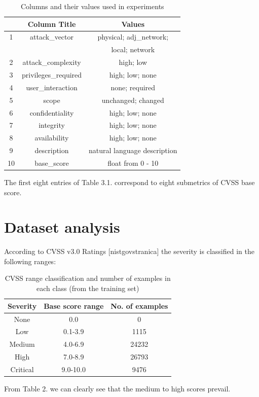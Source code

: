 \documentclass[times, utf8, zavrsni, english]{fer}
\begin{document}
\begin{table}[h!]
	\centering
	\begin{tabular}{||c c c ||} 
		\hline
		 & Column Title & Values  \\ [0.5ex] 
		\hline\hline
		
		1 & attack\_vector & physical; adj\_network;   \\
		 & &  local; network \\
		2 & attack\_complexity & high; low  \\
		3 & privileges\_required & high; low; none  \\
		4 & user\_interaction & none; required \\ 
		5 & scope & unchanged; changed \\ 
		6 & confidentiality & high; low; none  \\
		7 & integrity & high; low; none  \\
		8 & availability & high; low; none  \\
		
		\hline\hline
		9 & description & natural language description \\
		10 & base\_score & float from 0 - 10 \\
		\hline
	\end{tabular}
\caption{Columns and their values used in experiments}
\label{table:1}
\end{table}

The first eight entries of Table 3.1. correspond to eight submetrics of CVSS base score.
\section{Dataset analysis}
According to CVSS v3.0 Ratings [nistgovstranica] the severity is classified in the following ranges:
\begin{table}[h!]
	\centering
	\begin{tabular}{| c c c ||} 
		\hline
		Severity & Base score range & No. of examples\\ [0.5ex] 
		\hline\hline
		
		None & 0.0 & 0  \\
		Low &  0.1-3.9 & 1115 \\
		Medium & 4.0-6.9 & 24232  \\
		High & 7.0-8.9  & 26793 \\
		Critical & 9.0-10.0 & 9476\\
		\hline
	\end{tabular}
	\caption{CVSS range classification and number of examples in each class (from the training set)}
	\label{table:2}
\end{table}
From Table 2. we can clearly see that the medium to high scores prevail. 
\end{document}

